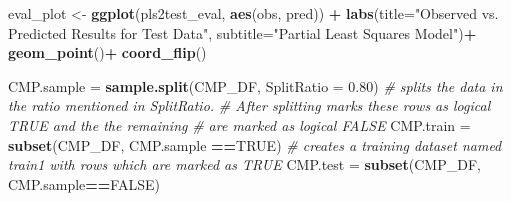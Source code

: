 \documentclass[]{report}
\newenvironment{Shaded}{\begin{snugshade}}{\end{snugshade}}
\newcommand{\KeywordTok}[1]{\textcolor[rgb]{0.13,0.29,0.53}{\textbf{#1}}}
\newcommand{\DataTypeTok}[1]{\textcolor[rgb]{0.13,0.29,0.53}{#1}}
\newcommand{\FloatTok}[1]{\textcolor[rgb]{0.00,0.00,0.81}{#1}}
\newcommand{\StringTok}[1]{\textcolor[rgb]{0.31,0.60,0.02}{#1}}
\newcommand{\CommentTok}[1]{\textcolor[rgb]{0.56,0.35,0.01}{\textit{#1}}}
\newcommand{\OtherTok}[1]{\textcolor[rgb]{0.56,0.35,0.01}{#1}}
\newcommand{\OperatorTok}[1]{\textcolor[rgb]{0.81,0.36,0.00}{\textbf{#1}}}
\newcommand{\NormalTok}[1]{#1}
\begin{document}
\begin{Shaded}
\begin{Highlighting}[]
{{{{{{{{{{{{\NormalTok{eval_plot <-}\StringTok{ }\KeywordTok{ggplot}\NormalTok{(pls2test_eval, }\KeywordTok{aes}\NormalTok{(obs, pred)) }\OperatorTok{+}\StringTok{ }
\StringTok{  }\KeywordTok{labs}\NormalTok{(}\DataTypeTok{title=}\StringTok{"Observed vs. Predicted Results for Test Data"}\NormalTok{,}
       \DataTypeTok{subtitle=}\StringTok{"Partial Least Squares Model"}\NormalTok{)}\OperatorTok{+}\StringTok{ }
\StringTok{  }\KeywordTok{geom_point}\NormalTok{()}\OperatorTok{+}
\StringTok{  }\KeywordTok{coord_flip}\NormalTok{()}

\NormalTok{CMP.sample =}\StringTok{ }\KeywordTok{sample.split}\NormalTok{(CMP_DF, }\DataTypeTok{SplitRatio =} \FloatTok{0.80}\NormalTok{) }
\CommentTok{# splits the data in the ratio mentioned in SplitRatio. }
\CommentTok{# After splitting marks these rows as logical TRUE and the the remaining }
\CommentTok{# are marked as logical FALSE}
\NormalTok{CMP.train =}\StringTok{ }\KeywordTok{subset}\NormalTok{(CMP_DF, CMP.sample }\OperatorTok{==}\OtherTok{TRUE}\NormalTok{) }
\CommentTok{# creates a training dataset named train1 with rows which are marked as TRUE}
\NormalTok{CMP.test =}\StringTok{ }\KeywordTok{subset}\NormalTok{(CMP_DF, CMP.sample}\OperatorTok{==}\OtherTok{FALSE}\NormalTok{)}

}}}}}}}}}}}}
\end{Highlighting}
\end{Shaded}
\end{document}
